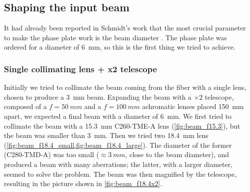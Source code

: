 \subsection{Shaping the input beam}
It had already been reported in Schmidt's work that the most crucial parameter to make the phase plate work is the beam diameter \cite{schmidt2021}. The phase plate was ordered for a diameter of \SI{6}{mm}, so this is the first thing we tried to achieve.

\subsubsection{Single collimating lens + x2 telescope}
Initially we tried to collimate the beam coming from the fiber with a single lens, chosen to produce a \SI{3}{mm} beam. Expanding the beam with a $\times 2$ telescope, composed of a $f=\SI{50}{mm}$ and a $f=\SI{100}{mm}$ achromatic lenses placed \SI{150}{mm} apart, we expected a final beam with a diameter of \SI{6}{mm}. We first tried to collimate the beam with a \SI{15.3}{mm} C260-TME-A lens (\cref{fig:beam_f15.3}), but the beam was smaller than \SI{3}{mm}. Then we tried two \SI{18.4}{mm} lens (\cref{fig:beam_f18.4_small,fig:beam_f18.4_large}). The diameter of the former (C280-TMD-A) was too small ($\approx \SI{3}{mm}$, close to the beam diameter), and produced a beam with many aberrations; the latter, with a larger diameter, seemed to solve the problem. The beam was then magnified by the telescope, resulting in the picture shown in \cref{fig:beam_f18.4x2}.

